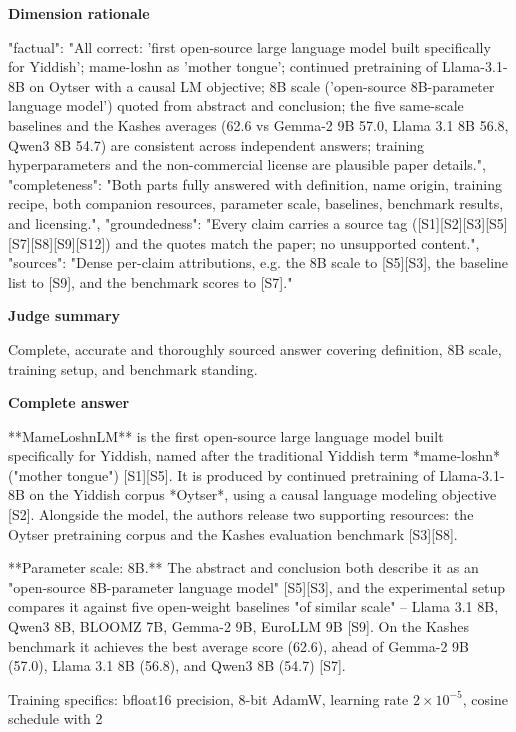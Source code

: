 \documentclass[10pt]{article}
\begin{document}
\textbf{Dimension rationale}
\begin{EvidenceText}
{
  "factual": "All correct: 'first open-source large language model built specifically for Yiddish'; mame-loshn as 'mother tongue'; continued pretraining of Llama-3.1-8B on Oytser with a causal LM objective; 8B scale ('open-source 8B-parameter language model') quoted from abstract and conclusion; the five same-scale baselines and the Kashes averages (62.6 vs Gemma-2 9B 57.0, Llama 3.1 8B 56.8, Qwen3 8B 54.7) are consistent across independent answers; training hyperparameters and the non-commercial license are plausible paper details.",
  "completeness": "Both parts fully answered with definition, name origin, training recipe, both companion resources, parameter scale, baselines, benchmark results, and licensing.",
  "groundedness": "Every claim carries a source tag ([S1][S2][S3][S5][S7][S8][S9][S12]) and the quotes match the paper; no unsupported content.",
  "sources": "Dense per-claim attributions, e.g. the 8B scale to [S5][S3], the baseline list to [S9], and the benchmark scores to [S7]."
}
\end{EvidenceText}

\textbf{Judge summary}
\begin{EvidenceText}
Complete, accurate and thoroughly sourced answer covering definition, 8B scale, training setup, and benchmark standing.
\end{EvidenceText}

\textbf{Complete answer}
\begin{AnswerText}
**MameLoshnLM** is the first open-source large language model built specifically for Yiddish, named after the traditional Yiddish term *mame-loshn* ("mother tongue") [S1][S5]. It is produced by continued pretraining of Llama-3.1-8B on the Yiddish corpus *Oytser*, using a causal language modeling objective [S2]. Alongside the model, the authors release two supporting resources: the Oytser pretraining corpus and the Kashes evaluation benchmark [S3][S8].

**Parameter scale: 8B.** The abstract and conclusion both describe it as an "open-source 8B-parameter language model" [S5][S3], and the experimental setup compares it against five open-weight baselines "of similar scale" -- Llama 3.1 8B, Qwen3 8B, BLOOMZ 7B, Gemma-2 9B, EuroLLM 9B [S9]. On the Kashes benchmark it achieves the best average score (62.6), ahead of Gemma-2 9B (57.0), Llama 3.1 8B (56.8), and Qwen3 8B (54.7) [S7].

Training specifics: bfloat16 precision, 8-bit AdamW, learning rate $2\times10^{-5}$, cosine schedule with 2%
\end{AnswerText}
\end{document}
